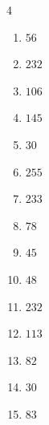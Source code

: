 \begin{multicols}{4}
\begin{enumerate}
  \item $56$


  \item $232$


  \item $106$


  \item $145$


  \item $30$


  \item $255$


  \item $233$


  \item $78$


  \item $45$


  \item $48$


  \item $232$


  \item $113$


  \item $82$


  \item $30$


  \item $83$


\columnbreak %

\resetques


\end{enumerate}
\end{multicols}
